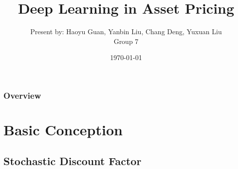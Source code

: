 \documentclass{beamer}
\title[MF796 - Computational Methods]{Deep Learning in Asset Pricing} %
\author{Present by: Haoyu Guan, Yanbin Liu, Chang Deng, Yuxuan Liu\\
Group 7 } %
\institute[BU] %
{
MS in Mathematical Finance, Questrom \\ %
\medskip
Boston University
\medskip
}
\date{\today} %
\begin{document}
\begin{frame}
\titlepage %
\end{frame}

\begin{frame}
\frametitle{Overview}
\tableofcontents %
\end{frame}


\section{Basic Conception} %

\subsection{Stochastic Discount Factor} %
\end{document}
